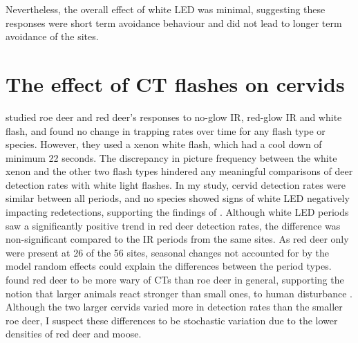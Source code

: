 

Nevertheless, the overall effect of white LED was minimal, suggesting these responses were short term avoidance behaviour and did not lead to longer term avoidance of the sites. %











\section{The effect of CT flashes on cervids}
\textcite{Henrich2020} studied roe deer and red deer's responses to no-glow IR, red-glow IR and white flash, and found no change in trapping rates over time for any flash type or species. However, they used a xenon white flash, which had a cool down of minimum 22 seconds. The discrepancy in picture frequency between the white xenon and the other two flash types hindered any meaningful comparisons of deer detection rates with white light flashes. 
In my study, cervid detection rates were similar between all periods, and no species showed signs of white LED negatively impacting redetections, supporting the findings of \textcite{Henrich2020}.
Although white LED periods saw a significantly positive trend in red deer detection rates, the difference was non-significant compared to the IR periods from the same sites. As red deer only were present at 26 of the 56 sites, seasonal changes not accounted for by the model random effects could explain the differences between the period types.
\textcite{Henrich2020} found red deer to be more wary of CTs than roe deer in general, supporting the notion that larger animals react stronger than small ones, to human disturbance \autocite{Gaynor2018}.
Although the two larger cervids varied more in detection rates than the smaller roe deer, I suspect these differences to be stochastic variation due to the lower densities of red deer and moose.


